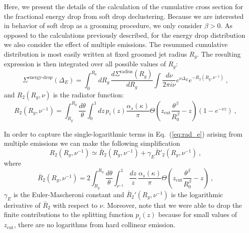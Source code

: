 \documentclass[letterpaper,11pt]{article}
\newcommand{\zcut}{z_\text{cut}}
\DeclareRobustCommand{\Eq}[1]{Eq.~(\ref{#1})}
\begin{document}
Here, we present the details of the calculation of the cumulative cross section for the fractional energy drop from soft drop declustering.
Because we are interested in behavior of soft drop as a grooming procedure, we only consider $\beta>0$.
As opposed to the calculations previously described, for the energy drop distribution we also consider the effect of multiple emissions.
The resummed cumulative distribution is most easily written at fixed groomed jet radius $R_g$. The resulting expression is then integrated over all possible values of $R_g$:
\begin{equation}\label{eq:de_cum}
\Sigma^\text{energy-drop}(\Delta_E) = \int_0^{R_0} dR_g \, \frac{d \Sigma^\text{radius}(R_g) }{d R_g}\int \frac{d\nu}{2\pi i \nu}e^{\nu \Delta_E}  e^{-R_2\left(R_g,\nu^{-1}\right)} \ ,
\end{equation}
and $R_2(R_g,\nu)$ is the radiator function:
\begin{equation}\label{eq:rad_e}
R_2\left(R_g,\nu^{-1}\right)=\int_{R_g}^{R_0}\frac{d\theta}{\theta} \int_0^1 dz\, p_i(z) \frac{\alpha_s(\kappa)}{\pi}\Theta\left( z_\text{cut}\frac{\theta^\beta}{R_0^\beta}-z  \right)\left( 1- e^{-\nu z}  \right) \ ,
\end{equation}



In order to capture the single-logarithmic terms in \Eq{eq:rad_e} arising from multiple emissions we can make the following simplification~\cite{Catani:1992ua,Dokshitzer:1998kz,caesar}
\begin{equation}
{R}_2\left(R_g,\nu^{-1}\right)\simeq \bar{R}_2\left(R_g,\nu^{-1}\right) + \gamma_E \bar{R}'_2\left(R_g,\nu^{-1}\right) \ ,
\end{equation}
where
\begin{equation}
\bar{R}_2\left(R_g,\nu^{-1}\right)=2\int_{R_g}^{R_0}\frac{d\theta}{\theta} \int_{\nu^{-1}}^1 \frac{dz}{z}\, \frac{\alpha_s(\kappa)}{\pi}\Theta\left( z_\text{cut}\frac{\theta^\beta}{R_0^\beta}-z  \right) \ ,
\end{equation}
$\gamma_E$ is the Euler-Mascheroni constant and $\bar{R}_2'\left(R_g,\nu^{-1}\right)$ is the logarithmic derivative of $\bar{R}_2$ with respect to $\nu$. Moreover, note that we were able to drop the finite contributions to the splitting function $p_i(z)$ because 
for small values of $\zcut$, there are no logarithms from hard collinear emission. 
\end{document}
